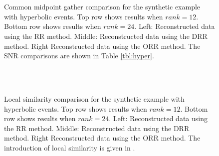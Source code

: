 {\begin{figure}
	\centering
     \\ 
     \\    
	\caption{Common midpoint gather comparison for the synthetic example with hyperbolic events. Top row shows results when $rank=12$. Bottom row shows results when $rank=24$. Left: Reconstructed data using the RR method. Middle: Reconstructed data using the DRR method. Right Reconstructed data using the ORR method. The SNR comparisons are shown in Table \ref{tbl:hyper}.}
	\label{fig:hyper_dn_N12}
\end{figure}

\begin{figure}
	\centering
     \\ 
     \\    
	\caption{Local similarity comparison for the synthetic example with hyperbolic events. Top row shows results when $rank=12$. Bottom row shows results when $rank=24$. Left: Reconstructed data using the RR method. Middle: Reconstructed data using the DRR method. Right Reconstructed data using the ORR method. The introduction of local similarity is given in \cite{yangkang2015ortho}. }
	\label{fig:hyper_simi_N12}
\end{figure}


















}
